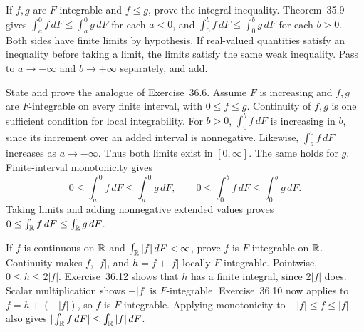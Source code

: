 \goal If $f,g$ are $F$-integrable and $f\leq g$, prove the integral
inequality.
Theorem~35.9 gives
$\int_a^0 f\,dF\leq\int_a^0 g\,dF$ for each $a<0$, and
$\int_0^b f\,dF\leq\int_0^b g\,dF$ for each $b>0$.
Both sides have finite limits by hypothesis. If real-valued
quantities satisfy an inequality before taking a limit, the limits
satisfy the same weak inequality. Pass to $a\to-\infty$ and
$b\to+\infty$ separately, and add.

\goal State and prove the analogue of Exercise~36.6.
Assume $F$ is increasing and $f,g$ are $F$-integrable on every
finite interval, with $0\leq f\leq g$. Continuity of $f,g$ is
one sufficient condition for local integrability.
For $b>0$, $\int_0^b f\,dF$ is increasing in $b$, since its
increment over an added interval is nonnegative. Likewise,
$\int_a^0 f\,dF$ increases as $a\to-\infty$. Thus both limits
exist in $[0,\infty]$. The same holds for $g$.
Finite-interval monotonicity gives
\[
 0\leq\int_a^0 f\,dF\leq\int_a^0 g\,dF,
 \qquad
 0\leq\int_0^b f\,dF\leq\int_0^b g\,dF.
\]
Taking limits and adding nonnegative extended values proves
$0\leq\int_{\mathbb{R}} f\,dF\leq\int_{\mathbb{R}} g\,dF$.

\goal If $f$ is continuous on $\mathbb{R}$ and $\int_{\mathbb{R}}|f|\,dF<\infty$,
prove $f$ is $F$-integrable on $\mathbb{R}$.
Continuity makes $f$, $|f|$, and $h=f+|f|$ locally $F$-integrable.
Pointwise, $0\leq h\leq2|f|$. Exercise~36.12 shows that
$h$ has a finite integral, since $2|f|$ does.
Scalar multiplication shows $-|f|$ is $F$-integrable.
Exercise~36.10 now applies to $f=h+(-|f|)$, so $f$ is
$F$-integrable. Applying monotonicity to $-|f|\leq f\leq|f|$
also gives $|\int_{\mathbb{R}} f\,dF|\leq\int_{\mathbb{R}}|f|\,dF$.

